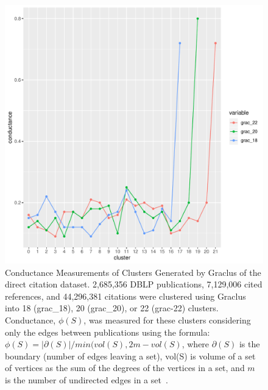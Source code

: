 \begin{figure}[ht]
\centering
  \includegraphics[scale=0.4]{graclus_comparison.pdf}
\caption{Conductance Measurements of Clusters Generated by Graclus of the direct citation dataset.  2,685,356 DBLP publications, 7,129,006 cited references, and 44,296,381 citations were clustered using Graclus into 18 (grac\_18), 20 (grac\_20), or 22 (grac-22) clusters. Conductance, $\phi(S)$, was measured for these clusters considering only the edges between publications using the formula: $\phi(S)=|\partial(S)|/min(vol(S),2m-vol(S)$, where $\partial(S)$ is the boundary (number of edges leaving a set), vol(S) is volume of a set of vertices as the sum of the degrees of the vertices in a set, and $m$ is the number of undirected edges in a set~\cite{shun_parallel_2016}.}
\label{fig:graclus_comparison_conductance}       
\end{figure}

\newpage

